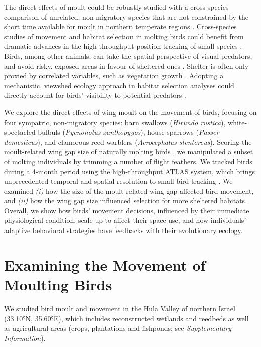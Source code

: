 The direct effects of moult could be robustly studied with a cross-species comparison of unrelated, non-migratory species that are not constrained by the short time available for moult in northern temperate regions \parencite{ginn1983,jenni2020}.
Cross-species studies of movement and habitat selection in molting birds could benefit from dramatic advances in the high-throughput position tracking of small species \parencite{toledo2020,nathan2022}.
Birds, among other animals, can take the spatial perspective of visual predators, and avoid risky, exposed areas in favour of sheltered ones \parencite{hampton1994,emery2000,krams2001,davidson2016,krams2020}.
Shelter is often only proxied by correlated variables, such as vegetation growth \parencite{pettorelli2011}. 
Adopting a mechanistic, viewshed ecology approach \parencite{olsoy2015,aben2018,aben2021} in habitat selection analyses could directly account for birds' visibility to potential predators \parencite{olsoy2015,aben2018,aben2021}.

We explore the direct effects of wing moult on the movement of birds, focusing on four sympatric, non-migratory species: barn swallows (\textit{Hirundo rustica}), white-spectacled bulbuls (\textit{Pycnonotus xanthopygos}), house sparrows (\textit{Passer domesticus}), and clamorous reed-warblers (\textit{Acrocephalus stentoreus}).
Scoring the moult-related wing gap size of naturally molting birds \citep{lind2001,kiat2016}, we manipulated a subset of molting individuals by trimming a number of flight feathers.
We tracked birds during a 4-month period using the high-throughput ATLAS system, which brings unprecedented temporal and spatial resolution to small bird tracking \citep{toledo2014,weiser2016,toledo2020,nathan2022,beardsworth2022mee}.
We examined \textit{(i)} how the size of the moult-related wing gap affected bird movement, and \textit{(ii)} how the wing gap size influenced selection for more sheltered habitats.
Overall, we show how birds' movement decisions, influenced by their immediate physiological condition, scale up to affect their space use, and how individuals' adaptive behavioral strategies have feedbacks with their evolutionary ecology.

\section*{Examining the Movement of Moulting Birds}

We studied bird moult and movement in the Hula Valley of northern Israel (33.10°N, 35.60°E), which includes reconstructed wetlands and reedbeds as well as agricultural areas (crops, plantations and fishponds; see \textit{Supplementary Information}).


